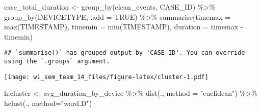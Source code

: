 \documentclass[
]{article}
\newenvironment{Shaded}{\begin{snugshade}}{\end{snugshade}}
\newcommand{\AttributeTok}[1]{\textcolor[rgb]{0.77,0.63,0.00}{#1}}
\newcommand{\ConstantTok}[1]{\textcolor[rgb]{0.00,0.00,0.00}{#1}}
\newcommand{\FunctionTok}[1]{\textcolor[rgb]{0.00,0.00,0.00}{#1}}
\newcommand{\NormalTok}[1]{#1}
\newcommand{\OtherTok}[1]{\textcolor[rgb]{0.56,0.35,0.01}{#1}}
\newcommand{\SpecialCharTok}[1]{\textcolor[rgb]{0.00,0.00,0.00}{#1}}
\newcommand{\StringTok}[1]{\textcolor[rgb]{0.31,0.60,0.02}{#1}}
\begin{document}
\begin{Shaded}
\begin{Highlighting}[]
\NormalTok{case\_total\_duration }\OtherTok{\textless{}{-}} \FunctionTok{group\_by}\NormalTok{(clean\_events, CASE\_ID) }\SpecialCharTok{\%\textgreater{}\%}
  \FunctionTok{group\_by}\NormalTok{(DEVICETYPE, }\AttributeTok{.add =} \ConstantTok{TRUE}\NormalTok{) }\SpecialCharTok{\%\textgreater{}\%}
  \FunctionTok{summarise}\NormalTok{(}\AttributeTok{timemax =} \FunctionTok{max}\NormalTok{(TIMESTAMP), }\AttributeTok{timemin =} \FunctionTok{min}\NormalTok{(TIMESTAMP), }\AttributeTok{duration =}\NormalTok{ timemax }\SpecialCharTok{{-}}\NormalTok{ timemin)}
\end{Highlighting}
\end{Shaded}

\begin{verbatim}
## `summarise()` has grouped output by 'CASE_ID'. You can override using the `.groups` argument.
\end{verbatim}

\begin{Shaded}
\end{Shaded}

\texttt{[image: wi\_sem\_team\_14\_files/figure-latex/cluster-1.pdf]}

\begin{Shaded}
\begin{Highlighting}[]
\NormalTok{h.cluster }\OtherTok{\textless{}{-}}\NormalTok{ avg\_duration\_by\_device }\SpecialCharTok{\%\textgreater{}\%} \FunctionTok{dist}\NormalTok{(., }\AttributeTok{method =} \StringTok{"euclidean"}\NormalTok{) }\SpecialCharTok{\%\textgreater{}\%} \FunctionTok{hclust}\NormalTok{(., }\AttributeTok{method=}\StringTok{"ward.D"}\NormalTok{)}
\end{Highlighting}
\end{Shaded}
\end{document}
